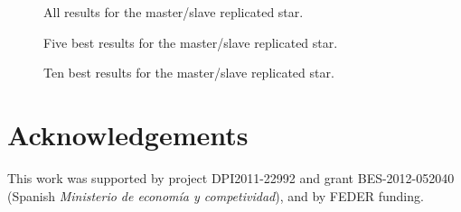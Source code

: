 \documentclass[times,a4paper,10pt,twocolumn]{article}
\theoremstyle{definition}
\theoremstyle{definition}
\theoremstyle{plain}
\begin{document}

\begin{figure}
\centering
{}
\caption{All results for the master/slave replicated star.}
\label{fig:master_slave_star_results_all}
\end{figure}

\begin{figure}
\centering
{}
\caption{Five best results for the master/slave replicated star.}
\label{fig:master_slave_star_results_5_best}
\end{figure}

\begin{figure}
\centering
{}
\caption{Ten best results for the master/slave replicated star.}
\label{fig:master_slave_star_results_10_best}
\end{figure}





\section*{Acknowledgements}

This work was supported by project DPI2011-22992 and grant BES-2012-052040
(Spanish \emph{Ministerio de econom\'ia y competividad}), and by FEDER funding.








\end{document}
